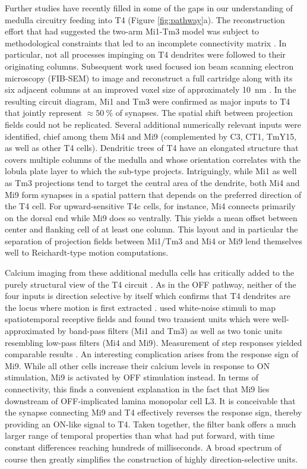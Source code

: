 Further studies have recently filled in some of the gaps in our understanding of medulla circuitry feeding into T4 (Figure \ref{fig:pathway}a). The reconstruction effort that had suggested the two-arm Mi1-Tm3 model was subject to methodological constraints that led to an incomplete connectivity matrix \citep{Takemura:2013ea}. In particular, not all processes impinging on T4 dendrites were followed to their originating columns. Subsequent work used focused ion beam scanning electron microscopy (FIB-SEM) to image and reconstruct a full cartridge along with its six adjacent columns at an improved voxel size of approximately \SI{10}{\nano\meter} \citep{Takemura:2017aa}. In the resulting circuit diagram, Mi1 and Tm3 were confirmed as major inputs to T4 that jointly represent $\approx\SI{50}{\percent}$ of synapses. The spatial shift between projection fields could not be replicated. Several additional numerically relevant inputs were identified, chief among them Mi4 and Mi9 (complemented by C3, CT1, TmY15, as well as other T4 cells). Dendritic trees of T4 have an elongated structure that covers multiple columns of the medulla and whose orientation correlates with the lobula plate layer to which the sub-type projects. Intriguingly, while Mi1 as well as Tm3 projections tend to target the central area of the dendrite, both Mi4 and Mi9 form synapses in a spatial pattern that depends on the preferred direction of the T4 cell. For upward-sensitive T4c cells, for instance, Mi4 connects primarily on the dorsal end while Mi9 does so ventrally. This yields a mean offset between center and flanking cell of at least one column. This layout and in particular the separation of projection fields between Mi1/Tm3 and Mi4 or Mi9 lend themselves well to Reichardt-type motion computations.

Calcium imaging from these additional medulla cells has critically added to the purely structural view of the T4 circuit \citep{Strother:2014aa,Arenz:2017aa,Strother:2017aa}. As in the OFF pathway, neither of the four inputs is direction selective by itself which confirms that T4 dendrites are the locus where motion is first extracted \citep{Strother:2017aa}. \citet{Arenz:2017aa} used white-noise stimuli to map spatiotemporal receptive fields and found two transient units which were well-approximated by band-pass filters (Mi1 and Tm3) as well as two tonic units resembling low-pass filters (Mi4 and Mi9). Measurement of step responses yielded comparable results \citep{Strother:2017aa}. An interesting complication arises from the response sign of Mi9. While all other cells increase their calcium levels in response to ON stimulation, Mi9 is activated by OFF stimulation instead. In terms of connectivity, this finds a convenient explanation in the fact that Mi9 lies downstream of OFF-implicated lamina monopolar cell L3. It is conceivable that the synapse connecting Mi9 and T4 effectively reverses the response sign, thereby providing an ON-like signal to T4. Taken together, the filter bank offers a much larger range of temporal properties than what \citet{Behnia:2014jh} had put forward, with time constant differences reaching hundreds of milliseconds. A broad spectrum of course then greatly simplifies the construction of highly direction-selective units.

